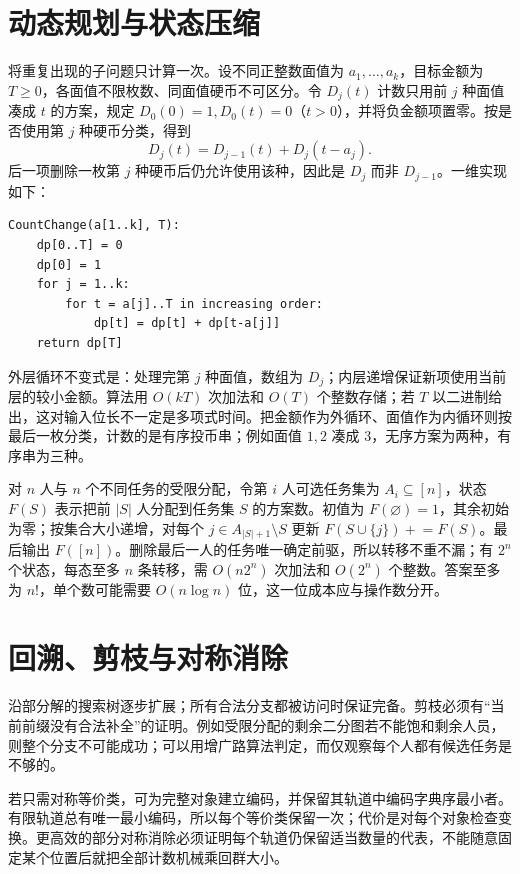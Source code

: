 \documentclass[UTF8,12pt,a4paper,fontset=fandol]{ctexbook}
\begin{document}
\section{动态规划与状态压缩}

将重复出现的子问题只计算一次。设不同正整数面值为 $a_1,\ldots,a_k$，目标金额为 $T\ge0$，各面值不限枚数、同面值硬币不可区分。令 $D_j(t)$ 计数只用前 $j$ 种面值凑成 $t$ 的方案，规定 $D_0(0)=1,D_0(t)=0$（$t>0$），并将负金额项置零。按是否使用第 $j$ 种硬币分类，得到
\[
 D_j(t)=D_{j-1}(t)+D_j(t-a_j).
\]
后一项删除一枚第 $j$ 种硬币后仍允许使用该种，因此是 $D_j$ 而非 $D_{j-1}$。一维实现如下：
\begin{verbatim}
CountChange(a[1..k], T):
    dp[0..T] = 0
    dp[0] = 1
    for j = 1..k:
        for t = a[j]..T in increasing order:
            dp[t] = dp[t] + dp[t-a[j]]
    return dp[T]
\end{verbatim}
外层循环不变式是：处理完第 $j$ 种面值，数组为 $D_j$；内层递增保证新项使用当前层的较小金额。算法用 $O(kT)$ 次加法和 $O(T)$ 个整数存储；若 $T$ 以二进制给出，这对输入位长不一定是多项式时间。把金额作为外循环、面值作为内循环则按最后一枚分类，计数的是有序投币串；例如面值 $1,2$ 凑成 $3$，无序方案为两种，有序串为三种。

对 $n$ 人与 $n$ 个不同任务的受限分配，令第 $i$ 人可选任务集为 $A_i\subseteq[n]$，状态 $F(S)$ 表示把前 $|S|$ 人分配到任务集 $S$ 的方案数。初值为 $F(\varnothing)=1$，其余初始为零；按集合大小递增，对每个 $j\in A_{|S|+1}\setminus S$ 更新 $F(S\cup\{j\})\mathrel{+}=F(S)$。最后输出 $F([n])$。删除最后一人的任务唯一确定前驱，所以转移不重不漏；有 $2^n$ 个状态，每态至多 $n$ 条转移，需 $O(n2^n)$ 次加法和 $O(2^n)$ 个整数。答案至多为 $n!$，单个数可能需要 $O(n\log n)$ 位，这一位成本应与操作数分开。

\section{回溯、剪枝与对称消除}

沿部分解的搜索树逐步扩展；所有合法分支都被访问时保证完备。剪枝必须有“当前前缀没有合法补全”的证明。例如受限分配的剩余二分图若不能饱和剩余人员，则整个分支不可能成功；可以用增广路算法判定，而仅观察每个人都有候选任务是不够的。

若只需对称等价类，可为完整对象建立编码，并保留其轨道中编码字典序最小者。有限轨道总有唯一最小编码，所以每个等价类保留一次；代价是对每个对象检查变换。更高效的部分对称消除必须证明每个轨道仍保留适当数量的代表，不能随意固定某个位置后就把全部计数机械乘回群大小。
\end{document}
